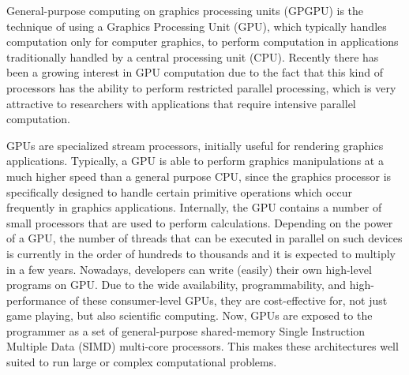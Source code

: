 \documentclass{comjnl}
\begin{document}
General-purpose computing on graphics processing units (GPGPU) is the
technique of using a Graphics Processing Unit (GPU), which typically
handles computation only for computer graphics, %
to perform computation in applications traditionally handled by a
central processing unit (CPU). Recently there has been a growing
interest in GPU computation due to the fact that this kind of
processors has the ability to perform restricted parallel processing,
which is very attractive to researchers with applications that require
intensive parallel computation. 


GPUs are specialized stream processors, initially useful for rendering graphics applications. Typically, a GPU is able to perform graphics manipulations at a much higher speed than a general purpose CPU, since the graphics processor is specifically designed to handle certain primitive operations which occur frequently in graphics applications. Internally, the GPU contains a number of small processors that are used to perform calculations. 
Depending on the power of a GPU, the number of threads that can be executed in parallel on such devices is currently in the order of hundreds to thousands and it is expected to multiply in a few years. Nowadays, developers can write (easily) their own high-level programs on GPU. Due to the wide availability, programmability, and high-performance of these consumer-level GPUs, they are cost-effective for, not just game playing, but also scientific computing.
Now, GPUs are exposed to the programmer as a set of general-purpose shared-memory Single Instruction Multiple Data (SIMD) multi-core processors. 
This makes these architectures well suited to run large or complex computational problems. 
\end{document}

